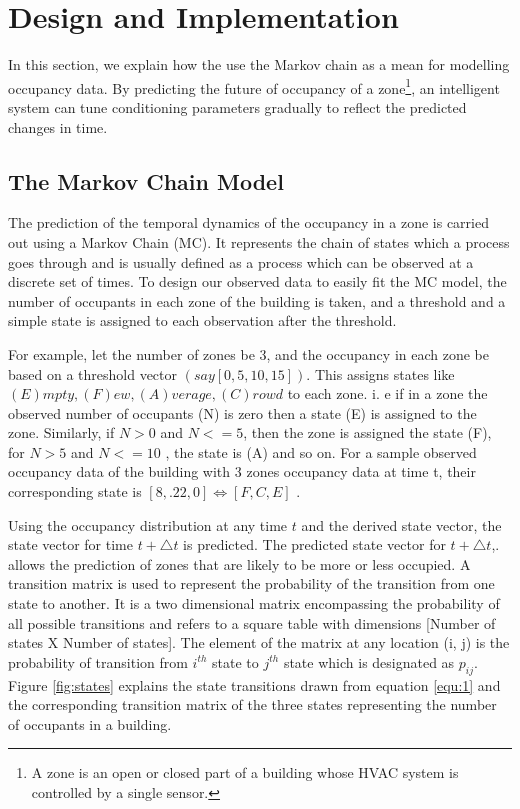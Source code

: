 \section{Design and Implementation}
\label{sec:design}

In this section, we explain how the use the Markov chain as a mean for modelling occupancy data. By predicting the future of occupancy of a zone\footnote{A zone is an open or closed part of a building whose HVAC system is controlled by a single sensor.}, an intelligent system can tune conditioning parameters gradually to reflect the predicted changes in time.

\subsection{The Markov Chain Model}
The prediction of the temporal dynamics of the occupancy in a zone is carried out using a Markov Chain (MC).  It represents the chain of states which a process goes through and is usually defined as a process which can be observed at a discrete set of times.  To design our observed data to easily fit the MC model, the number of occupants in each zone of the building is taken, and a threshold and a simple state is assigned to each observation after the threshold.

For example, let the number of zones be 3, and the occupancy in each zone be based on a threshold vector $(say [0, 5, 10, 15])$.  This assigns states like \\
${(E)mpty,  (F)ew,  (A)verage,  (C)rowd} $ to each zone.  i. e if in a zone the observed number of occupants (N) is zero then a state (E) is assigned to the zone.  Similarly, if $N > 0 $ and $N <= 5$, then the zone is assigned the state (F), for $N > 5 $ and $N <= 10$ ,  the state is (A) and so on.  For a sample observed occupancy data of the building with 3 zones occupancy data at time t, their corresponding state is $[8,.22, 0] \Leftrightarrow [F,  C,  E]$ .

Using the occupancy distribution at any time ${t}$ and the derived state vector, the state vector for time ${t + \triangle t}$  is predicted.  The predicted state vector for ${t + \triangle t} $,. allows  the prediction of zones that are likely to be more or less occupied.  A transition matrix is used to represent the probability of the transition from one state to another.  It is a two dimensional matrix encompassing the probability of all possible transitions  and refers to a square table with dimensions [Number of states X Number of states].   The element of the matrix at any location (i, j) is the probability of transition from $i^{th}$ state to $j^{th}$ state which is designated as $p _ {ij}$.   Figure \ref{fig:states} explains the state transitions drawn from equation \ref{equ:1} and the corresponding transition matrix of the three states representing the number of occupants in a building.



